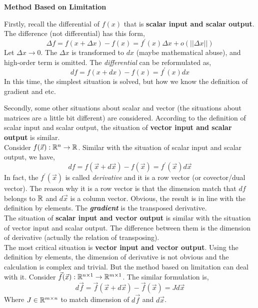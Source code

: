 		 \textbf{Method Based on Limitation}\\
		 \par Firstly, recall the differential of $f(x)$ that is \textbf{scalar input and scalar output}. The difference (not differential) has this form,
		 $$
		 \Delta f = f(x+\Delta x)-f(x) = f^{'}(x)\Delta x + o(||\Delta x||)
		 $$
		 Let $\Delta x\rightarrow 0$. The $\Delta x$ is transformed to $dx$ (maybe mathematical abuse), and high-order term is omitted. The \emph{differential} can be reformulated as,
		 $$
		 df = f(x+dx)-f(x) = f^{'}(x)dx
		 $$
		 In this time, the simplest situation is solved, but how we know the definition of gradient and etc.\\
		 \par Secondly, some other situations about scalar and vector (the situations about matrices are a little bit different) are considered. According to the definition of scalar input and scalar output, the situation of \textbf{vector input and scalar output} is similar. \\
		 Consider $f(\vec x):\mathbb{R}^{n}\rightarrow \mathbb{R}$. Similar with the situation of scalar input and scalar output, we have,
		 $$
		 df=f(\vec x+d\vec x)-f(\vec x)=f^{'}(\vec x)d\vec x
		 $$
		 In fact, the $f^{'}(\vec x)$ is called \emph{derivative} and it is a row vector (or covector/dual vector). The reason why it is a row vector is that the dimension match that $df$ belongs to $\mathbb{R}$ and $d\vec x$ is a column vector. Obvious, the result is in line with the definition by elements. The \textbf{\emph{gradient}} is the transposed derivative. \\
		 The situation of \textbf{scalar input and vector output} is similar with the situation of vector input and scalar output. The difference between them is the dimension of derivative (actually the relation of transposing).\\
		 The most critical situation is \textbf{vector input and vector output}. Using the definition by elements, the dimension of derivative is not obvious and the calculation is complex and trivial. But the method based on limitation can deal with it. Consider $\vec f(\vec x):\mathbb{R}^{n\times 1}\rightarrow \mathbb{R}^{m \times 1}$. The similar formulation is,
		 $$
		 	d\vec f = \vec f(\vec x+d\vec x) -\vec f(\vec x) = Jd\vec x
		 $$
		 Where $J\in\mathbb{R}^{m\times n}$ to match dimension of $d\vec f$ and $d\vec x$.\\
		 
